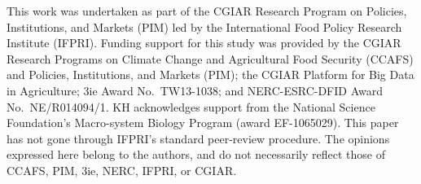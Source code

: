 \documentclass[, manuscript]{copernicus}
\begin{document}



\begin{acknowledgements}
This work was undertaken as part of the CGIAR Research Program on
Policies, Institutions, and Markets (PIM) led by the International Food
Policy Research Institute (IFPRI). Funding support for this study was
provided by the CGIAR Research Programs on Climate Change and
Agricultural Food Security (CCAFS) and Policies, Institutions, and
Markets (PIM); the CGIAR Platform for Big Data in Agriculture; 3ie Award
No.~TW13-1038; and NERC-ESRC-DFID Award No.~NE/R014094/1. KH
acknowledges support from the National Science Foundation's Macro-system
Biology Program (award EF-1065029). This paper has not gone through
IFPRI's standard peer-review procedure. The opinions expressed here
belong to the authors, and do not necessarily reflect those of CCAFS,
PIM, 3ie, NERC, IFPRI, or CGIAR.
\end{acknowledgements}







\end{document}
